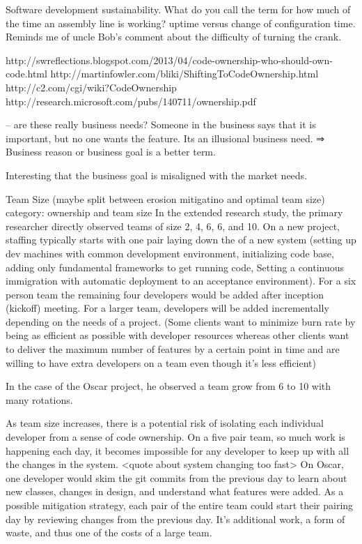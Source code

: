 Software development sustainability. What do you call the term for how much of the time an assembly line is working? uptime  versus change of configuration time.  Reminds me of uncle Bob's comment about the difficulty of turning the crank. 

http://swreflections.blogspot.com/2013/04/code-ownership-who-should-own-code.html
http://martinfowler.com/bliki/ShiftingToCodeOwnership.html
http://c2.com/cgi/wiki?CodeOwnership
http://research.microsoft.com/pubs/140711/ownership.pdf


 -- are these really business needs? Someone in the business says that it is important, but no one wants the feature. Its an illusional business need. ⇒ Business reason or business goal is a better term.

Interesting that the business goal is misaligned with the market needs. 


Team Size (maybe split between erosion mitigatino and optimal team size)
category: ownership and team size
In the extended research study, the primary researcher directly observed teams of size 2, 4, 6, 6, and 10. On a new project, staffing typically starts with one pair laying down the  of a new system (setting up dev machines with common development environment, initializing code base, adding only fundamental frameworks to get running code, Setting a continuous immigration with automatic deployment to an acceptance environment). For a six person team the remaining four developers would be added after inception (kickoff) meeting. For a larger team, developers will be added incrementally depending on the needs of a project. (Some clients want to minimize burn rate by being as efficient as possible with developer resources whereas other clients want to deliver the maximum number of features by a certain point in time and are willing to have extra developers on a team even though it's less efficient)

In the case of the Oscar project, he observed a team grow from 6 to 10 with many rotations.

As team size increases, there is a potential risk of isolating each individual developer from a sense of code ownership. On a five pair team, so much work is happening each day, it becomes impossible for any developer to keep up with all the changes in the system. <quote about system changing too fast> On Oscar, one developer would skim the git commits from the previous day to learn about new classes, changes in design, and understand what features were added. As a possible mitigation strategy, each pair of the entire team could start their pairing day by reviewing changes from the previous day. It's additional work, a form of waste, and thus one of the costs of a large team. 

